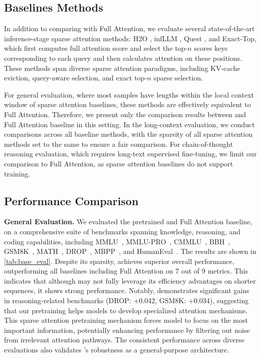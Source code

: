 \subsection{Baselines Methods} 
In addition to comparing with Full Attention, we evaluate several state-of-the-art inference-stage sparse attention methods: H2O \citep{h2o}, infLLM \citep{infllm}, Quest \citep{quest}, and Exact-Top, which first computes full attention score and select the top-$n$ scores keys corresponding to each query and then calculates attention on these positions. These methods span diverse sparse attention paradigms, including KV-cache eviction, query-aware selection, and exact top-$n$ sparse selection. 

For general evaluation, where most samples have lengths within the local context window of sparse attention baselines, these methods are effectively equivalent to Full Attention. Therefore, we present only the comparison results between \method{} and Full Attention baseline in this setting. In the long-context evaluation, we conduct comparisons across all baseline methods, with the sparsity of all sparse attention methods set to the same to ensure a fair comparison. For chain-of-thought reasoning evaluation, which requires long-text supervised fine-tuning, we limit our comparison to Full Attention, as sparse attention baselines do not support training.






\subsection{Performance Comparison}


\textbf{General Evaluation.} We evaluated the pretrained \method{} and Full Attention baseline, on a comprehensive suite of benchmarks spanning knowledge, reasoning, and coding capabilities, including MMLU~\citep{hendrycks2020measuring}, MMLU-PRO~\citep{wang2024mmlu}, CMMLU~\citep{li2023cmmlu}, BBH~\citep{suzgun2022challenging}, GSM8K~\citep{cobbe2021training}, MATH~\citep{hendrycks2020measuring}, DROP~\citep{dua2019drop}, MBPP~\citep{austin2021program}, and HumanEval~\citep{chen2021evaluating}. The results are shown in \cref{tab:base_eval}. Despite its sparsity, \method{} achieves superior overall performance, outperforming all baselines including Full Attention on 7 out of 9 metrics. This indicates that although \method{} may not fully leverage its efficiency advantages on shorter sequences, it shows strong performance.
Notably, \method{} demonstrates significant gains in reasoning-related benchmarks (DROP: +0.042, GSM8K: +0.034), suggesting that 
our pretraining helps models to develop specialized attention mechanisms. This sparse attention pretraining mechanism forces model to focus on the most important information, potentially enhancing performance by filtering out noise from irrelevant attention pathways.
The consistent performance across diverse evaluations also validates \method{}'s robustness as a general-purpose architecture.

